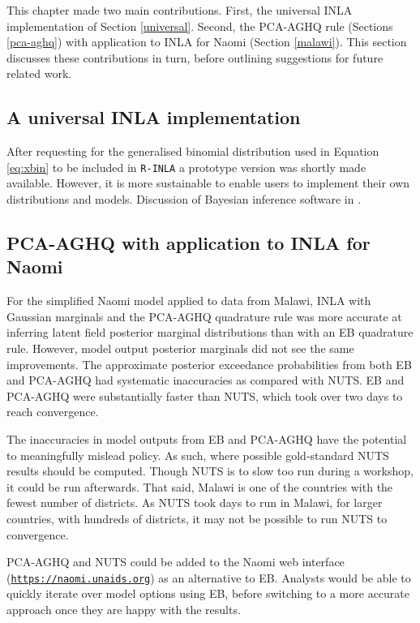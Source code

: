 \documentclass[a4paper, nobind]{templates/ociamthesis}
\begin{document}
This chapter made two main contributions.
First, the universal INLA implementation of Section \ref{universal}.
Second, the PCA-AGHQ rule (Sections \ref{pca-aghq}) with application to INLA for Naomi (Section \ref{malawi}).
This section discusses these contributions in turn, before outlining suggestions for future related work.

\hypertarget{a-universal-inla-implementation}{%
\subsection{A universal INLA implementation}\label{a-universal-inla-implementation}}

After requesting for the generalised binomial distribution used in Equation \eqref{eq:xbin} to be included in \texttt{R-INLA} a prototype version was shortly made available.
However, it is more sustainable to enable users to implement their own distributions and models.
Discussion of Bayesian inference software in \textcite{vstrumbelj2023past}.

\hypertarget{pca-aghq-with-application-to-inla-for-naomi}{%
\subsection{PCA-AGHQ with application to INLA for Naomi}\label{pca-aghq-with-application-to-inla-for-naomi}}

For the simplified Naomi model applied to data from Malawi, INLA with Gaussian marginals and the PCA-AGHQ quadrature rule was more accurate at inferring latent field posterior marginal distributions than with an EB quadrature rule.
However, model output posterior marginals did not see the same improvements.
The approximate posterior exceedance probabilities from both EB and PCA-AGHQ had systematic inaccuracies as compared with NUTS.
EB and PCA-AGHQ were substantially faster than NUTS, which took over two days to reach convergence.

The inaccuracies in model outputs from EB and PCA-AGHQ have the potential to meaningfully mislead policy.
As such, where possible gold-standard NUTS results should be computed.
Though NUTS is to slow too run during a workshop, it could be run afterwards.
That said, Malawi is one of the countries with the fewest number of districts.
As NUTS took days to run in Malawi, for larger countries, with hundreds of districts, it may not be possible to run NUTS to convergence.

PCA-AGHQ and NUTS could be added to the Naomi web interface (\href{https://naomi.unaids.org}{\texttt{https://naomi.unaids.org}}) as an alternative to EB.
Analysts would be able to quickly iterate over model options using EB, before switching to a more accurate approach once they are happy with the results.
\end{document}
